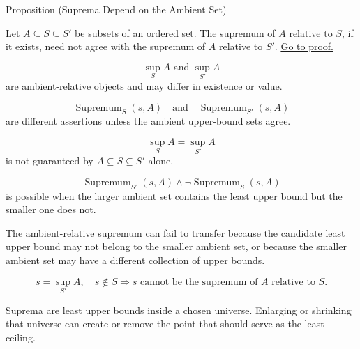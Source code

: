 \begin{propositionbox}{Proposition (Suprema Depend on the Ambient Set)}
\begin{proposition}
\label{prop:suprema-ambient-set}
Let $A\subseteq S\subseteq S'$ be subsets of an ordered set. The supremum of $A$ relative to $S$, if it exists, need not agree with the supremum of $A$ relative to $S'$.
\hyperref[prf:suprema-ambient-set]{Go to proof.}
\end{proposition}
\end{propositionbox}

\begin{remark*}
\[
\sup_S A\text{ and }\sup_{S'} A
\]
are ambient-relative objects and may differ in existence or value.
\end{remark*}

\begin{remark*}
\[
\operatorname{Supremum}_S(s,A)
\quad\text{and}\quad
\operatorname{Supremum}_{S'}(s,A)
\]
are different assertions unless the ambient upper-bound sets agree.
\end{remark*}

\begin{remark*}
\[
\sup_S A=\sup_{S'} A
\]
is not guaranteed by $A\subseteq S\subseteq S'$ alone.
\end{remark*}

\begin{remark*}
\[
\operatorname{Supremum}_{S'}(s,A)\land \neg\operatorname{Supremum}_S(s,A)
\]
is possible when the larger ambient set contains the least upper bound but the smaller one does not.
\end{remark*}

\begin{remark*}
The ambient-relative supremum can fail to transfer because the candidate least upper bound may not belong to the smaller ambient set, or because the smaller ambient set may have a different collection of upper bounds.
\end{remark*}

\begin{remark*}
\[
s=\sup_{S'} A,\quad s\notin S
\Longrightarrow
s\text{ cannot be the supremum of }A\text{ relative to }S.
\]
\end{remark*}

\begin{remark*}[Interpretation]
Suprema are least upper bounds inside a chosen universe. Enlarging or shrinking that universe can create or remove the point that should serve as the least ceiling.
\end{remark*}

